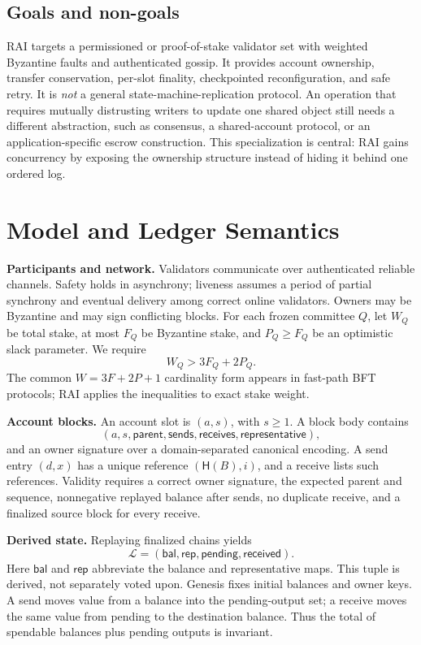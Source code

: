 \documentclass[sigplan,review,anonymous]{acmart}
\newcommand{\sys}{\textsc{RAI}\xspace}
\newcommand{\hash}{\mathsf{H}}
\newcommand{\ledger}{\mathcal{L}}
\newcommand{\paragraphhead}[1]{\smallskip\noindent\textbf{#1}}
\begin{document}
\subsection{Goals and non-goals}

\sys targets a permissioned or proof-of-stake validator set with weighted Byzantine faults and authenticated gossip.  It provides account ownership, transfer conservation, per-slot finality, checkpointed reconfiguration, and safe retry.  It is \emph{not} a general state-machine-replication protocol.  An operation that requires mutually distrusting writers to update one shared object still needs a different abstraction, such as consensus, a shared-account protocol, or an application-specific escrow construction.  This specialization is central: \sys gains concurrency by exposing the ownership structure instead of hiding it behind one ordered log.

\section{Model and Ledger Semantics}
\label{sec:model}

\paragraphhead{Participants and network.}
Validators communicate over authenticated reliable channels.  Safety holds in asynchrony; liveness assumes a period of partial synchrony and eventual delivery among correct online validators.  Owners may be Byzantine and may sign conflicting blocks.  For each frozen committee $Q$, let $W_Q$ be total stake, at most $F_Q$ be Byzantine stake, and $P_Q\ge F_Q$ be an optimistic slack parameter.  We require
\begin{equation}
    W_Q > 3F_Q + 2P_Q.
    \label{eq:weightassumption}
\end{equation}
The common $W=3F+2P+1$ cardinality form appears in fast-path BFT protocols; \sys applies the inequalities to exact stake weight.

\paragraphhead{Account blocks.}
An account slot is $(a,s)$, with $s\ge1$.  A block body contains
\[
 (a,s,\mathsf{parent},\mathsf{sends},\mathsf{receives},\mathsf{representative}),
\]
and an owner signature over a domain-separated canonical encoding.  A send entry $(d,x)$ has a unique reference $(\hash(B),i)$, and a receive lists such references.  Validity requires a correct owner signature, the expected parent and sequence, nonnegative replayed balance after sends, no duplicate receive, and a finalized source block for every receive.

\paragraphhead{Derived state.}
Replaying finalized chains yields
\[
  \ledger=(\mathsf{bal},\mathsf{rep},\mathsf{pending},\mathsf{received}).
\]
Here \(\mathsf{bal}\) and \(\mathsf{rep}\) abbreviate the balance and representative maps. This tuple is derived, not separately voted upon.  Genesis fixes initial balances and owner keys.  A send moves value from a balance into the pending-output set; a receive moves the same value from pending to the destination balance.  Thus the total of spendable balances plus pending outputs is invariant.
\end{document}
